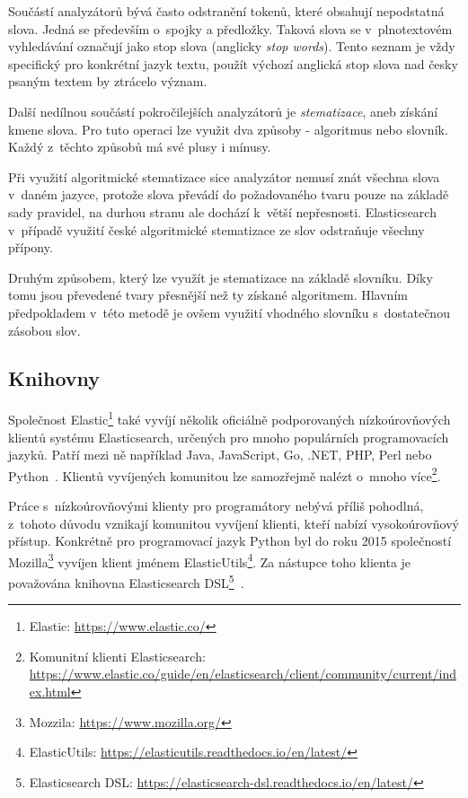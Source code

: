 Součástí analyzátorů bývá často odstranění tokenů, které obsahují nepodstatná slova. Jedná se především o~spojky a předložky. Taková slova se v~plnotextovém vyhledávání označují jako {stop slova} (anglicky \emph{stop words}). Tento seznam je vždy specifický pro konkrétní jazyk textu, použít výchozí anglická stop slova nad česky psaným textem by ztrácelo význam.

Další nedílnou součástí pokročilejších analyzátorů je \emph{stematizace}, aneb získání kmene slova. Pro tuto operaci lze využit dva způsoby - algoritmus nebo slovník. Každý z~těchto způsobů má své plusy i mínusy.

Při využití algoritmické stematizace sice analyzátor nemusí znát všechna slova v~daném jazyce, protože slova převádí do požadovaného tvaru pouze na základě sady pravidel, na durhou stranu ale dochází k~větší nepřesnosti. Elasticsearch v~případě využití české algoritmické stematizace ze slov odstraňuje všechny přípony.

Druhým způsobem, který lze využít je stematizace na základě slovníku. Díky tomu jsou převedené tvary přesnější než ty získané algoritmem. Hlavním předpokladem v~této metodě je ovšem využití vhodného slovníku s~dostatečnou zásobou slov.


\subsection{Knihovny}
Společnost Elastic\footnote{Elastic: \url{https://www.elastic.co/}} také vyvíjí několik oficiálně podporovaných nízkoúrovňových klientů systému Elasticsearch, určených pro mnoho populárních programovacích jazyků. Patří mezi ně například Java, JavaScript, Go, .NET, PHP, Perl nebo Python~\cite{bib:elastic-clients}.
Klientů vyvíjených komunitou lze samozřejmě nalézt o~mnoho více\footnote{Komunitní klienti Elasticsearch: \url{https://www.elastic.co/guide/en/elasticsearch/client/community/current/index.html}}.

Práce s~nízkoúrovňovými klienty pro programátory nebývá příliš pohodlná, z~tohoto důvodu vznikají komunitou vyvíjení klienti, kteří nabízí vysokoúrovňový přístup. Konkrétně pro programovací jazyk Python byl do roku 2015 společností Mozilla\footnote{Mozzila: \url{https://www.mozilla.org/}} vyvíjen klient jménem ElasticUtils\footnote{ElasticUtils: \url{https://elasticutils.readthedocs.io/en/latest/}}. Za nástupce toho klienta je považována knihovna Elasticsearch DSL\footnote{Elasticsearch DSL: \url{https://elasticsearch-dsl.readthedocs.io/en/latest/}}~\cite{bib:elastic-utils}.

